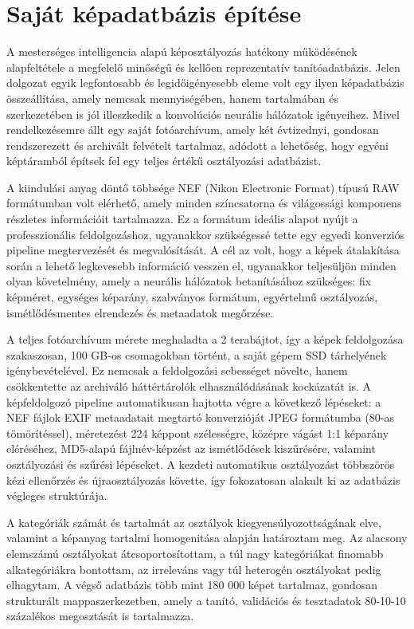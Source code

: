 \chapter{Saját képadatbázis építése}

A mesterséges intelligencia alapú képosztályozás hatékony működésének alapfeltétele a megfelelő minőségű és kellően reprezentatív tanítóadatbázis. Jelen dolgozat egyik legfontosabb és legidőigényesebb eleme volt egy ilyen képadatbázis összeállítása, amely nemcsak mennyiségében, hanem tartalmában és szerkezetében is jól illeszkedik a konvolúciós neurális hálózatok igényeihez. Mivel rendelkezésemre állt egy saját fotóarchívum, amely két évtizednyi, gondosan rendszerezett és archivált felvételt tartalmaz, adódott a lehetőség, hogy egyéni képtáramból építsek fel egy teljes értékű osztályozási adatbázist.

A kiindulási anyag döntő többsége NEF (Nikon Electronic Format) típusú RAW formátumban volt elérhető, amely minden színcsatorna és világossági komponens részletes információit tartalmazza. Ez a formátum ideális alapot nyújt a professzionális feldolgozáshoz, ugyanakkor szükségessé tette egy egyedi konverziós pipeline megtervezését és megvalósítását. A cél az volt, hogy a képek átalakítása során a lehető legkevesebb információ vesszen el, ugyanakkor teljesüljön minden olyan követelmény, amely a neurális hálózatok betanításához szükséges: fix képméret, egységes képarány, szabványos formátum, egyértelmű osztályozás, ismétlődésmentes elrendezés és metaadatok megőrzése.

A teljes fotóarchívum mérete meghaladta a 2 terabájtot, így a képek feldolgozása szakaszosan, 100 GB-os csomagokban történt, a saját gépem SSD tárhelyének igénybevételével. Ez nemcsak a feldolgozási sebességet növelte, hanem csökkentette az archiváló háttértárolók elhasználódásának kockázatát is. A képfeldolgozó pipeline automatikusan hajtotta végre a következő lépéseket: a NEF fájlok EXIF metaadatait megtartó konverzióját JPEG formátumba (80-as tömörítéssel), méretezést 224 képpont szélességre, középre vágást 1:1 képarány eléréséhez, MD5-alapú fájlnév-képzést az ismétlődések kiszűrésére, valamint osztályozási és szűrési lépéseket. A kezdeti automatikus osztályozást többszörös kézi ellenőrzés és újraosztályozás követte, így fokozatosan alakult ki az adatbázis végleges struktúrája.

A kategóriák számát és tartalmát az osztályok kiegyensúlyozottságának elve, valamint a képanyag tartalmi homogenitása alapján határoztam meg. Az alacsony elemszámú osztályokat átcsoportosítottam, a túl nagy kategóriákat finomabb alkategóriákra bontottam, az irreleváns vagy túl heterogén osztályokat pedig elhagytam. A végső adatbázis több mint 180 000 képet tartalmaz, gondosan strukturált mappaszerkezetben, amely a tanító, validációs és tesztadatok 80-10-10 százalékos megosztását is tartalmazza.

